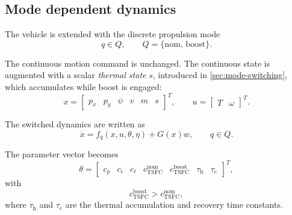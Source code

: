 \documentclass[11pt,a4paper]{article}
\newcommand{\Qset}{Q}
\newcommand{\vecx}{x}
\newcommand{\vecu}{u}
\newcommand{\vecw}{w}
\newcommand{\vectheta}{\theta}
\newcommand{\veceta}{\eta}
\newcommand{\vecf}{f}
\newcommand{\matG}{G}
\begin{document}
\subsection{Mode dependent dynamics}

The vehicle is extended with the discrete propulsion mode
\begin{equation}
  q \in \Qset, \qquad \Qset = \{\mathrm{nom},\, \mathrm{boost}\} .
\end{equation}

The continuous motion command is unchanged. The continuous state is augmented
with a scalar \emph{thermal state} $s$, introduced in
\cref{sec:mode-switching}, which accumulates while boost is engaged:
\begin{equation}
  \vecx = \begin{bmatrix} p_x & p_y & \psi & v & m & s \end{bmatrix}^{T},
  \qquad
  \vecu = \begin{bmatrix} T & \omega \end{bmatrix}^{T} .
\end{equation}

The switched dynamics are written as
\begin{equation}
  \dot{\vecx} = \vecf_q(\vecx, \vecu, \vectheta, \veceta) + \matG(\vecx)\vecw,
  \qquad q \in \Qset .
\end{equation}

The parameter vector becomes
\begin{equation}
  \vectheta = \begin{bmatrix}
    c_p & c_i & c_\ell &
    c^{\mathrm{nom}}_{\mathrm{TSFC}} & c^{\mathrm{boost}}_{\mathrm{TSFC}} &
    \tau_{\mathrm{h}} & \tau_{\mathrm{c}}
  \end{bmatrix}^{T},
\end{equation}
with
\begin{equation}
  c^{\mathrm{boost}}_{\mathrm{TSFC}} > c^{\mathrm{nom}}_{\mathrm{TSFC}},
\end{equation}
where $\tau_{\mathrm{h}}$ and $\tau_{\mathrm{c}}$ are the thermal accumulation
and recovery time constants.
\end{document}
